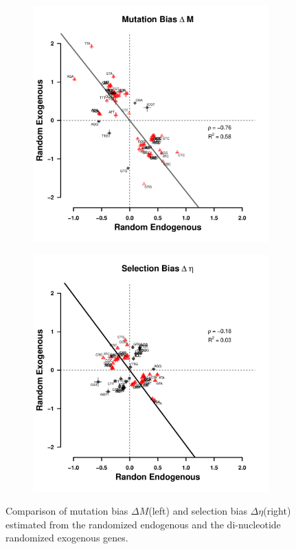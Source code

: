 \documentclass[doublespacing,linenumbers]{bmcart-modified}
\newcommand{\DM}{\ensuremath{{\Delta M}}\xspace}
\newcommand{\DE}{\ensuremath{{\Delta \eta}}\xspace}
\begin{document}
\begin{backmatter}
\begin{figure}
    \centering
    \begin{subfigure}
        \centering
        \includegraphics[width=.45\textwidth]{img/figS12a.pdf}
    \end{subfigure}
    \begin{subfigure}
        \centering
        \includegraphics[width=.45\textwidth]{img/figS12b.pdf}
    \end{subfigure}
    \caption{Comparison of mutation bias \DM (left) and selection bias \DE (right) estimated from the randomized endogenous and the di-nucleotide randomized exogenous genes.  }
    \label{fig:rnd_phi}
\end{figure}
\null
\vfill



\end{backmatter}
\end{document}
